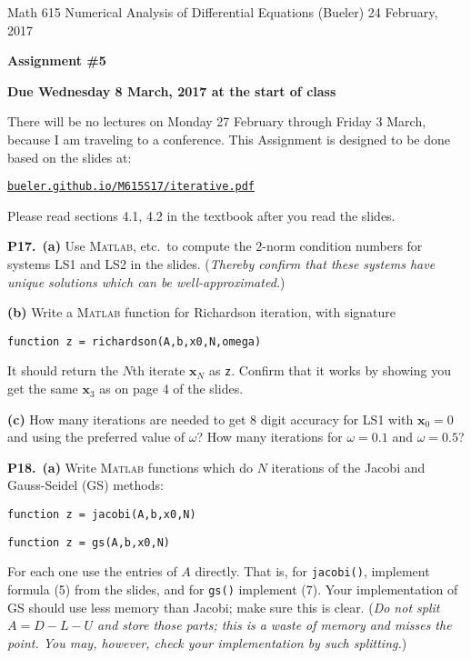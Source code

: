 \documentclass[12pt]{amsart}
\newcommand{\bx}{\mathbf{x}}
\newcommand{\prob}[1]{\bigskip\noindent\textbf{#1.}\quad }
\newcommand{\epart}[1]{\medskip\noindent\textbf{(#1)}\quad }
\newcommand{\ppart}[1]{\,\textbf{(#1)}\quad }
\newcommand{\Matlab}{\textsc{Matlab}\xspace}
\begin{document}
\scriptsize \noindent Math 615 Numerical Analysis of Differential Equations (Bueler) \hfill 24 February, 2017
\normalsize

\bigskip

\Large\centerline{\textbf{Assignment \#5}}
\large
\medskip

\centerline{\textbf{Due Wednesday 8 March, 2017 at the start of class}}
\bigskip
\normalsize

\thispagestyle{empty}

\bigskip
There will be no lectures on Monday 27 February through Friday 3 March, because I am traveling to a conference.  This Assignment is designed to be done based on the slides at:

\medskip
\centerline{\href{http://bueler.github.io/M615S17/iterative.pdf}{\texttt{bueler.github.io/M615S17/iterative.pdf}}}

\medskip
\noindent Please read sections 4.1, 4.2 in the textbook after you read the slides.

\medskip

\prob{P17}  \ppart{a}  Use \Matlab, etc.~to compute the $2$-norm condition numbers for systems LS1 and LS2 in the slides.  (\emph{Thereby confirm that these systems have unique solutions which can be well-approximated.})

\epart{b}  Write a \Matlab function for Richardson iteration, with signature

\bigskip
\centerline{\texttt{function z = richardson(A,b,x0,N,omega)}}

\bigskip
\noindent It should return the $N$th iterate $\bx_N$ as \texttt{z}.  Confirm that it works by showing you get the same $\bx_3$ as on page 4 of the slides.

\epart{c}  How many iterations are needed to get 8 digit accuracy for LS1 with $\bx_0=0$ and using the preferred value of $\omega$?  How many iterations for $\omega = 0.1$ and $\omega = 0.5$?


\prob{P18}  \ppart{a}  Write \Matlab functions which do $N$ iterations of the Jacobi and Gauss-Seidel (GS) methods:

\medskip
\centerline{\texttt{function z = jacobi(A,b,x0,N)}}

\centerline{\texttt{function z = gs(A,b,x0,N)}}

\medskip
\noindent For each one use the entries of $A$ directly.  That is, for \texttt{jacobi()}, implement formula (5) from the slides, and for \texttt{gs()} implement (7).  Your implementation of GS should use less memory than Jacobi; make sure this is clear.  (\emph{Do not split $A=D-L-U$ and store those parts; this is a waste of memory and misses the point.  You may, however, check your implementation by such splitting.})
\end{document}
